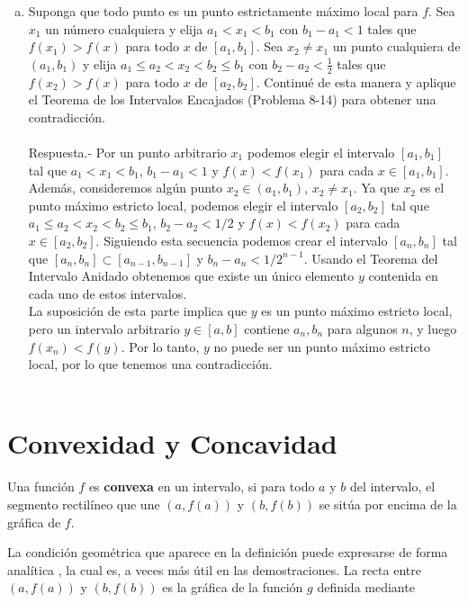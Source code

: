 \begin{enumerate}[\bfseries 1.]
\begin{enumerate}[(a)]
	\item Suponga que todo punto es un punto estrictamente máximo local para $f$. Sea $x_1$ un número cualquiera y elija $a_1 < x_1 < b_1$ con $b_1 -a_1 < 1$ tales que $f(x_1) > f(x)$ para todo $x$ de $[a_1, b_1]$. Sea $x_2\neq x_1$ un punto cualquiera de $(a_1, b_1)$ y elija $a_1 \leq a_2 < x_2 < b_2 \leq b_1$ con $b_2-a_2<\frac{1}{2}$ tales que $f(x_2) > f(x)$ para todo $x$ de $[a_2,b_2]$. Continué de esta manera y aplique el Teorema de los Intervalos Encajados (Problema 8-14) para obtener una contradicción.\\\\
	    Respuesta.-\; Por un punto arbitrario $x_1$ podemos elegir el intervalo $[a_1,b_1]$ tal que $a_1<x_1<b_1$, $b_1-a_1<1$ y $f(x)<f(x_1)$ para cada $x\in [a_1,b_1]$. Además, consideremos algún punto $x_2\in (a_1,b_1)$, $x_2\neq x_1$. Ya que $x_2$ es el punto máximo estricto local, podemos elegir el intervalo $[a_2,b_2]$ tal que $a_1\leq a_2<x_2<b_2\leq b_1$, $b_2-a_2<1/2$ y $f(x)<f(x_2)$ para cada $x\in [a_2,b_2]$. Siguiendo esta secuencia podemos crear el intervalo $[a_n,b_n]$ tal que $[a_n,b_n]\subset [a_{n-1},b_{n-1}]$ y $b_n-a_n<1/2^{n-1}$. Usando el Teorema del Intervalo Anidado obtenemos que existe un único elemento  $y$ contenida en cada uno de estos intervalos.\\
	    La suposición de esta parte implica que $y$ es un punto máximo estricto local, pero un intervalo arbitrario $y\in [a,b]$ contiene $a_n,b_n$ para algunos $n$, y luego $f(x_n)<f(y)$. Por lo tanto, $y$ no puede ser un punto máximo estricto local, por lo que tenemos una contradicción.\\\\
	\end{enumerate}

	
\end{enumerate}


\chapter*{Convexidad y Concavidad}

\begin{def.}
    Una función $f$ es \textbf{convexa} en un intervalo, si para todo $a$ y $b$ del intervalo, el segmento rectilíneo que une $\left(a,f(a)\right)$ y $\left(b,f(b)\right)$ se sitúa por encima de la gráfica de $f.$
\end{def.}

La condición geométrica que aparece en la definición puede expresarse de forma analítica , la cual es, a veces más útil en las demostraciones. La recta entre $(a,f(a))$ y $(b,f(b))$ es la gráfica de la función $g$ definida mediante

